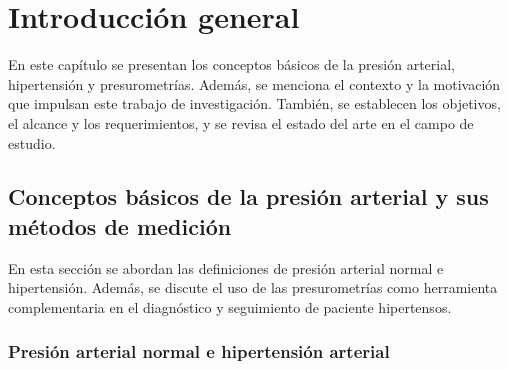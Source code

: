 
\chapter{Introducción general} %

\label{Chapter1} %
\label{IntroGeneral}


\newcommand{\keyword}[1]{\textbf{#1}}
\newcommand{\tabhead}[1]{\textbf{#1}}
\newcommand{\code}[1]{\texttt{#1}}
\newcommand{\file}[1]{\texttt{\bfseries#1}}
\newcommand{\option}[1]{\texttt{\itshape#1}}
\newcommand{\grados}{$^{\circ}$}



En este capítulo se presentan los conceptos básicos de la presión arterial, hipertensión y presurometrías.
Además, se menciona  el contexto y la motivación que impulsan este trabajo de investigación. 
También, se establecen los objetivos, el alcance y los requerimientos, y se revisa el estado del arte 
en el campo de estudio.

\section{Conceptos básicos de la presión arterial y sus métodos de medición}

En esta sección se abordan las definiciones de presión arterial normal e hipertensión. 
Además, se discute el uso de las presurometrías como herramienta complementaria en el diagnóstico 
y seguimiento de paciente hipertensos.

\subsection{Presión arterial normal e hipertensión arterial}

